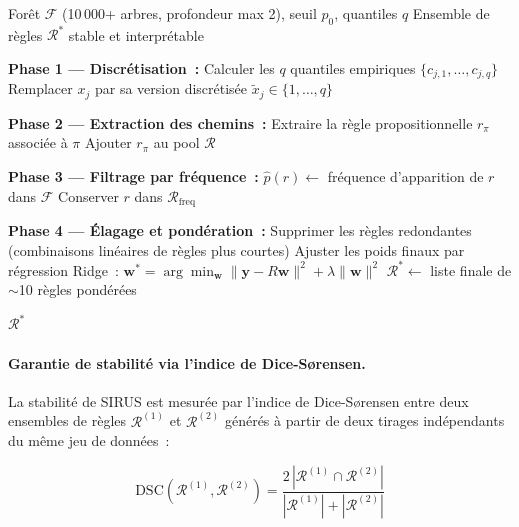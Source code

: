 \begin{algorithm}[H]
\caption{Algorithme SIRUS}
\begin{algorithmic}[1]
\Require Forêt $\mathcal{F}$ (10\,000+ arbres, profondeur max 2), seuil $p_0$, quantiles $q$
\Ensure Ensemble de règles $\mathcal{R}^*$ stable et interprétable

\State \textbf{Phase 1 — Discrétisation~:}
    \State Calculer les $q$ quantiles empiriques $\{c_{j,1}, \ldots, c_{j,q}\}$
    \State Remplacer $x_j$ par sa version discrétisée $\tilde{x}_j \in \{1, \ldots, q\}$
\EndFor
{}

\State \textbf{Phase 2 — Extraction des chemins~:}
        \State Extraire la règle propositionnelle $r_\pi$ associée à $\pi$
        \State Ajouter $r_\pi$ au pool $\mathcal{R}$
    \EndFor
\EndFor

\State \textbf{Phase 3 — Filtrage par fréquence~:}
    \State $\hat{p}(r) \leftarrow$ fréquence d'apparition de $r$ dans $\mathcal{F}$
        \State Conserver $r$ dans $\mathcal{R}_{\text{freq}}$
    \EndIf
\EndFor

\State \textbf{Phase 4 — Élagage et pondération~:}
\State Supprimer les règles redondantes (combinaisons linéaires de règles plus courtes)
\State Ajuster les poids finaux par régression Ridge~: $\mathbf{w}^* = \arg\min_{\mathbf{w}} \|\mathbf{y} - R\mathbf{w}\|^2 + \lambda\|\mathbf{w}\|^2$
\State $\mathcal{R}^* \leftarrow$ liste finale de $\sim$10 règles pondérées

\State \Return $\mathcal{R}^*$
\end{algorithmic}
\end{algorithm}

\paragraph{Garantie de stabilité via l'indice de Dice-Sørensen.}

La stabilité de SIRUS est mesurée par l'indice de Dice-Sørensen entre deux ensembles
de règles $\mathcal{R}^{(1)}$ et $\mathcal{R}^{(2)}$ générés à partir de deux tirages
indépendants du même jeu de données~:

\begin{equation}
  \mathrm{DSC}(\mathcal{R}^{(1)}, \mathcal{R}^{(2)}) = \frac{2\,|\mathcal{R}^{(1)} \cap \mathcal{R}^{(2)}|}{|\mathcal{R}^{(1)}| + |\mathcal{R}^{(2)}|}
  \label{eq:dice_sorensen}
\end{equation}

